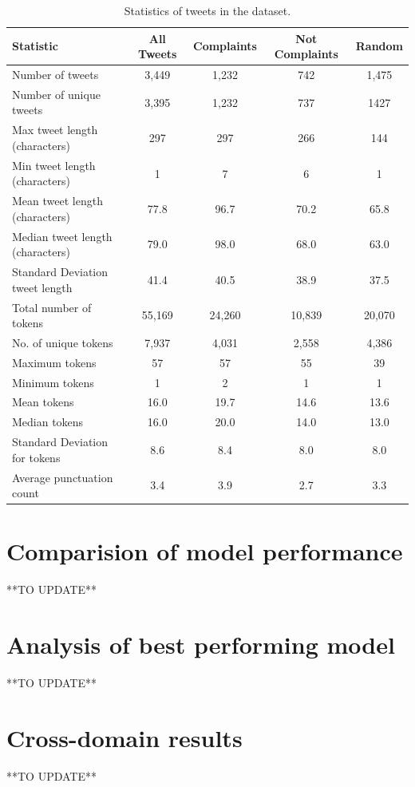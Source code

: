 \begin{table}[htbp]
    \captionsetup{font=small}
    \centering
    \begin{tabularx}{\textwidth}{|X|c|c|c|c|}
        \hline
        \rowcolor[gray]{0.7}
        Statistic                        & All Tweets & Complaints & Not Complaints & Random \\
        \hline
        Number of tweets                 & 3,449      & 1,232      & 742            & 1,475  \\
        \hline
        Number of unique tweets          & 3,395      & 1,232      & 737            & 1427   \\
        \hline
        \hline
        Max tweet length (characters)    & 297        & 297        & 266            & 144    \\
        \hline
        Min tweet length (characters)    & 1          & 7          & 6              & 1      \\
        \hline
        Mean tweet length (characters)   & 77.8       & 96.7       & 70.2           & 65.8   \\
        \hline
        Median tweet length (characters) & 79.0       & 98.0       & 68.0           & 63.0   \\
        \hline
        Standard Deviation tweet length  & 41.4       & 40.5       & 38.9           & 37.5   \\
        \hline
        \hline
        Total number of tokens           & 55,169     & 24,260     & 10,839         & 20,070 \\
        \hline
        No. of unique tokens             & 7,937      & 4,031      & 2,558          & 4,386  \\
        \hline
        Maximum tokens                   & 57         & 57         & 55             & 39     \\
        \hline
        Minimum tokens                   & 1          & 2          & 1              & 1      \\
        \hline
        Mean tokens                      & 16.0       & 19.7       & 14.6           & 13.6   \\
        \hline
        Median tokens                    & 16.0       & 20.0       & 14.0           & 13.0   \\
        \hline
        Standard Deviation for tokens    & 8.6        & 8.4        & 8.0            & 8.0    \\
        \hline
        \hline
        Average punctuation count        & 3.4        & 3.9        & 2.7            & 3.3    \\
        \hline
    \end{tabularx}
    \caption{Statistics of tweets in the dataset.}
    \label{tab: tweets_statistics}
\end{table}
\section{Comparision of model performance}
**TO UPDATE**

\section{Analysis of best performing model}
**TO UPDATE**

\section{Cross-domain results}
**TO UPDATE**
